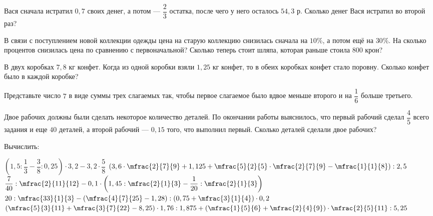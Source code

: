 \begin{class}[number=2]
	\begin{listofex}
		\item Вася сначала истратил \(0,7\) своих денег, а потом --- \(\dfrac{2}{3} \) остатка, после чего у него осталось \(54,3\) р. Сколько денег Вася истратил во второй раз?
		\item В связи с поступлением новой коллекции одежды цена на старую коллекцию снизилась сначала на \(10\%\), а потом ещё на \(30\%\). На сколько процентов снизилась цена по сравнению с первоначальной? Сколько теперь стоит шляпа, которая раньше стоила \(800\) крон?
		\item В двух коробках \(7,8\) кг конфет. Когда из одной коробки взяли \(1,25\) кг конфет, то в обеих коробках конфет стало поровну. Сколько конфет было в каждой коробке?
		\item Представьте число \(7\) в виде суммы трех слагаемых так, чтобы первое слагаемое было вдвое меньше второго и на \(\dfrac{1}{6}\) больше третьего.
		\item Двое рабочих должны были сделать некоторое количество деталей. По окончании работы выяснилось, что первый рабочий сделал \(\dfrac{4}{5}\) всего задания и еще \(40\) деталей, а второй рабочий --- \(0,15\) того, что выполнил первый. Сколько деталей сделали двое рабочих?
		\item Вычислить:
			\begin{itasks}[1]
				\task \( \left(  1,5 : \dfrac{1}{3} - \dfrac{3}{8} : 0,25 \right) \cdot 3,2 - 3,2 \cdot \dfrac{5}{8} \)
				\task \( \left(  3,6 \cdot \mfrac{2}{7}{9} + 1,125 + \mfrac{5}{2}{5} \cdot  \mfrac{2}{7}{9} - \mfrac{1}{1}{8} \right) : 2,5 \)
				\task \( \dfrac{7}{40} : \mfrac{2}{11}{12} - 0,1 \cdot \left( 1,45 : \mfrac{2}{1}{3} - \dfrac{1}{20} : \mfrac{2}{1}{3} \right) \)
				\task \( 20 : \mfrac{33}{1}{3} - \left( \mfrac{4}{7}{25} - 1,28 \right) : \left( 0,75 + \mfrac{3}{1}{4} \right) \cdot 0,2 \)
				\task \( \left( \mfrac{5}{3}{11} + \mfrac{3}{7}{22} - 8,25 \right) \cdot 1,76 : 1,875 + \left( \mfrac{1}{5}{6} + \mfrac{2}{4}{9} \right) \cdot \mfrac{2}{5}{11} : 5,25 \)
			\end{itasks}
	\end{listofex}
\end{class}

